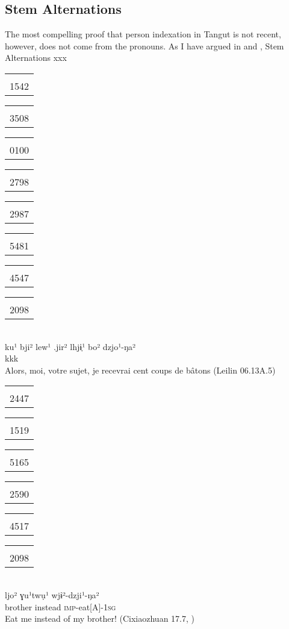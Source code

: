 \documentclass[oldfontcommands,oneside,a4paper,11pt]{article}
\newcommand{\ipa}[1]{{\phon \mbox{#1}}} %
\newcommand{\tgf}[1]{\begin{tabular}{l}\mo{#1}\\{\tiny #1}\end{tabular}}
\begin{document}
\subsection{Stem Alternations}
The most compelling proof that person indexation in Tangut is not recent, however, does not come from the pronouns. As I have argued in \citet{jacques09tangutverb} and \citet{jacques14esquisse}, Stem Alternations xxx

\begin{exe}
\ex 
\glll
\tgf{1542}	\tgf{3508}	\tgf{0100}	\tgf{2798}	\tgf{2987}	\tgf{5481}	\tgf{4547}	\tgf{2098}\\
   \ipa{ku¹}	\ipa{bji²}	\ipa{lew¹}	\ipa{.jir²}	\ipa{lhjɨ̣¹}	\ipa{bo²}	\ipa{dzjo¹-ŋa²} \\
kkk \\
\glt Alors, moi, votre sujet, je recevrai cent coups de bâtons (Leilin 06.13A.5)
\end{exe}


\begin{exe}
\ex \label{ex:2>1} 
\glll	\tgf{2447}	\tgf{1519}\tgf{5165}	\tgf{2590}\tgf{4517}\tgf{2098}\\
\ipa{ljo²}	\ipa{ɣu¹twụ¹}	\ipa{wjɨ²-dzji¹-ŋa²} \\
brother instead \textsc{imp}-eat[A]-\textsc{1sg} \\
\glt Eat me instead of my brother! (Cixiaozhuan 17.7, \citealt[55-6]{jacques07textes})
\end{exe}
\end{document}
